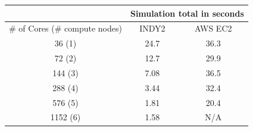 \begin{center}

\label{table:perf}

\begin{tabular}{|c|c|c|}
\hline
\multicolumn{1}{|l|}{}            & \multicolumn{2}{c|}{Simulation total in seconds}               \\ \hline
\multicolumn{1}{|c|}{\# of Cores (\# compute nodes)} & \multicolumn{1}{c|}{INDY2} & \multicolumn{1}{c|}{AWS EC2} \\ \hline
36 (1)                                & 24.7                       & 36.3                         \\ \hline
72 (2)                                & 12.7                       & 29.9                         \\ \hline
144 (3)                               & 7.08                       & 36.5                         \\ \hline
288 (4)                               & 3.44                       & 32.4                         \\ \hline
576 (5)                               & 1.81                       & 20.4                         \\ \hline
1152 (6)                              & 1.58                       & N/A                             \\ \hline
\end{tabular}

\end{center}



\vspace{0.5cm}

